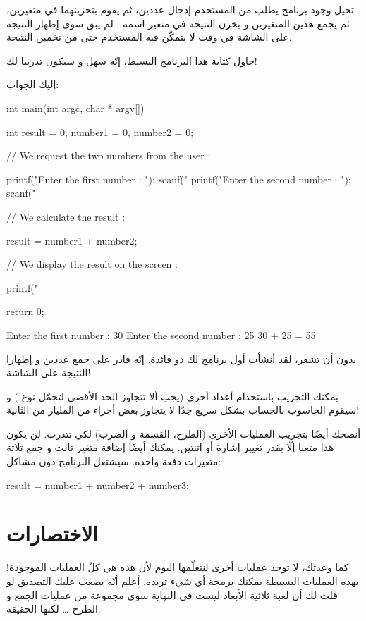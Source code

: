 تخيل وجود برنامج يطلب من المستخدم إدخال عددين، ثم يقوم بتخزينهما في متغيرين، ثم يجمع هذين المتغيرين و يخزن النتيجة في متغير اسمه
.
لم يبق سوى إظهار النتيجة على الشاشة في وقت لا يتمكّن فيه المستخدم حتى من تخمين النتيجة.

حاول كتابة هذا البرنامج البسيط، إنّه سهل و سيكون تدريبا لك!

إليك الجواب:

\begin{Csource}
int main(int argc, char * argv[])
{
  int result = 0, number1 = 0, number2 = 0;

  // We request the two numbers from the user :

  printf("Enter the first number : ");
  scanf("%
  printf("Enter the second number : ");
  scanf("%

  // We calculate the result :

  result = number1 + number2;

  // We display the result on the screen :

  printf("%

  return 0;
}
\end{Csource}

\begin{Console}
  Enter the first number : 30
  Enter the second number : 25
  30 + 25 = 55
\end{Console}

بدون أن تشعر، لقد أنشأت أول برنامج لك ذو فائدة. إنّه قادر على جمع عددين و إظهارا النتيجة على الشاشة!

يمكنك التجريب باستخدام أعداد أخرى (يجب ألا تتجاوز الحد الأقصى لتحمّل نوع )
و سيقوم الحاسوب بالحساب بشكل سريع جدًا لا يتجاوز بعض أجزاء من المليار من الثانية!

أنصحك أيضًا بتجريب العمليات الأخرى (الطرح، القسمة و الضرب) لكي تتدرب. لن يكون هذا متعبا إلّا بقدر تغيير إشارة أو اثنتين. يمكنك أيضًا إضافة متغير ثالث و جمع ثلاثة متغيرات دفعة واحدة. سيشتغل البرنامج دون مشاكل:

\begin{Csource}
result = number1 + number2 + number3;
\end{Csource}

\section{الاختصارات}

كما وعدتك، لا توجد عمليات أخرى لنتعلّمها اليوم لأن هذه هي كلّ العمليات الموجودة! بهذه العمليات البسيطة يمكنك برمجة أي شيء تريده. أعلم أنّه يصعب عليك التصديق لو قلت لك أن لعبة ثلاثية الأبعاد ليست في النهاية سوى مجموعة من عمليات الجمع و الطرح
\dots
لكنها الحقيقة.

